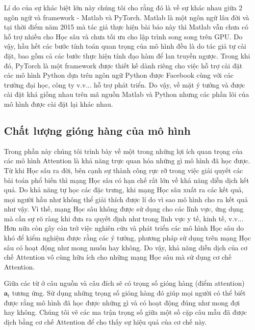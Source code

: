 Lí do của sự khác biệt lớn này chúng tôi cho rằng đó là về sự khác nhau giữa 2 ngôn ngữ và framework - Matlab và PyTorch. Matlab là một ngôn ngữ lâu đời và tại thời điểm năm 2015 mà tác giả thực hiện bài báo này thì Matlab vẫn chưa có hỗ trợ nhiều cho Học sâu và chưa tối ưu cho lập trình song song trên GPU. Do vậy, hầu hết các bước tính toán quan trọng của mô hình đều là do tác giả tự cài đặt, bao gồm cả các bước thực hiện tính đạo hàm để lan truyền ngược. Trong khi đó, PyTorch là một framework được thiết kế dành riêng cho việc hỗ trợ cài đặt các mô hình Python dựa trên ngôn ngữ Python được Facebook cùng với các trường đại học, công ty v.v... hỗ trợ phát triển. Do vậy, về mặt ý tưởng và được cài đặt khá giống nhau trên mã nguồn Matlab và Python nhưng các phần lõi của mô hình được cài đặt lại khác nhau.

\subsection{Chất lượng gióng hàng của mô hình}
Trong phần này chúng tôi trình bày về một trong những lợi ích quan trọng của các mô hình Attention là khả năng trực quan hóa những gì mô hình đã học được. Từ khi Học sâu ra đời, bên cạnh sự thành công rực rỡ trong việc giải quyết các bài toán phổ biến thì mạng Học sâu có hạn chế rất lớn về khả năng diễn dịch kết quả. Do khả năng tự học các đặc trưng, khi mạng Học sâu xuất ra các kết quả, mọi người hầu như không thể giải thích được lí do vì sao mô hình cho ra kết quả như vậy. Vì thế, mạng Học sâu không được sử dụng cho các lĩnh vực, ứng dụng mà cần sự rõ ràng khi đưa ra quyết định như trong lĩnh vực y tế, kinh tế, v.v... Hơn nữa còn gây cản trở việc nghiên cứu và phát triển các mô hình Học sâu do khó để kiểm nghiệm được rằng các ý tưởng, phương pháp sử dụng trên mạng Học sâu có hoạt động như mong muốn hay không. Do vậy, khả năng diễn dịch của cơ chế Attention vô cùng hữu ích cho những mạng Học sâu mà sử dụng cơ chế Attention.

Giữa các từ ở câu nguồn và câu đích sẽ có trọng số gióng hàng (điểm attention) $\bm{a}_t$ tương ứng. Sử dụng những trọng số gióng hàng đó giúp mọi người có thể biết được rằng mô hình đã học được những gì và có hoạt động đúng như mong đợi hay không. Chúng tôi vẽ các ma trận trọng số giữa một số cặp câu mẫu đã được dịch bằng cơ chế Attention để cho thấy sự hiệu quả của cơ chế này.